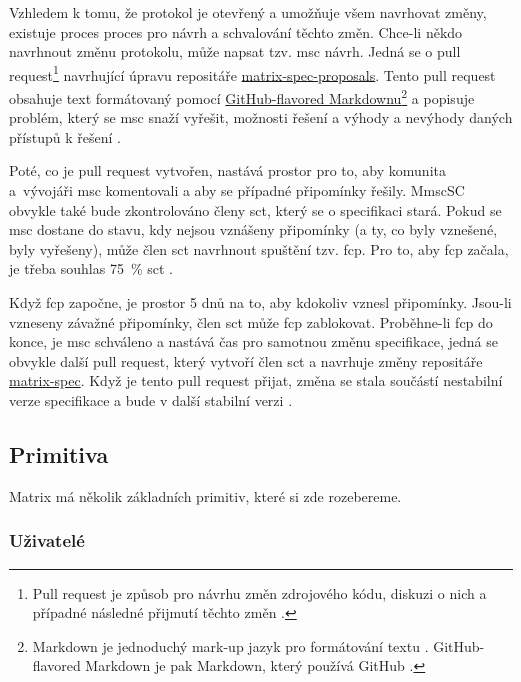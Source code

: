 Vzhledem k tomu, že protokol je otevřený a umožňuje všem navrhovat změny,
existuje proces proces pro návrh a schvalování těchto změn. Chce-li někdo
navrhnout změnu protokolu, může napsat tzv. \gls{msc} návrh. Jedná se o pull
request\footnote{ Pull request je způsob pro návrhu změn zdrojového kódu,
    diskuzi o nich a případné následné přijmutí těchto změn
    \parencite{GitHub-PullRequests}. } navrhující úpravu repositáře
\href{https://github.com/matrix-org/matrix-spec-proposals}{matrix-spec-proposals}.
Tento pull request obsahuje text formátovaný pomocí
\href{https://docs.github.com/en/get-started/writing-on-github/getting-started-with-writing-and-formatting-on-github/basic-writing-and-formatting-syntax}{GitHub-flavored
    Markdownu}\footnote{ Markdown je jednoduchý mark-up jazyk pro formátování textu
    \parencite{JohnGruber-Markdown}. GitHub-flavored Markdown je pak Markdown, který
    používá GitHub \parencite{GitHub-Markdown}. } a popisuje problém, který se
\gls{msc} snaží vyřešit, možnosti řešení a výhody a nevýhody daných přístupů k
řešení \parencite{MatrixORG-MSCs}.

Poté, co je pull request vytvořen, nastává prostor pro to, aby komunita
a~vývojáři \gls{msc} komentovali a aby se případné připomínky řešily.
M\gls{msc}SC obvykle také bude zkontrolováno členy \gls{sct}, který se o
specifikaci stará. Pokud se \gls{msc} dostane do stavu, kdy nejsou vznášeny
připomínky (a ty, co byly vznešené, byly vyřešeny), může člen \gls{sct}
navrhnout spuštění tzv. \gls{fcp}. Pro to, aby \gls{fcp} začala, je třeba
souhlas 75~\% \gls{sct} \parencite{MatrixORG-MSCs}.

Když \gls{fcp} započne, je prostor 5 dnů na to, aby kdokoliv vznesl připomínky.
Jsou-li vzneseny závažné připomínky, člen \gls{sct} může \gls{fcp} zablokovat.
Proběhne-li \gls{fcp} do konce, je \gls{msc} schváleno a nastává čas pro
samotnou změnu specifikace, jedná se obvykle další pull request, který vytvoří
člen \gls{sct} a navrhuje změny repositáře
\href{https://github.com/matrix-org/matrix-spec}{matrix-spec}. Když je tento
pull request přijat, změna se stala součástí nestabilní verze specifikace a bude
v další stabilní verzi \parencite{MatrixORG-MSCs}.

\subsection{Primitiva}

Matrix má několik základních primitiv, které si zde rozebereme.

\subsubsection{Uživatelé}

